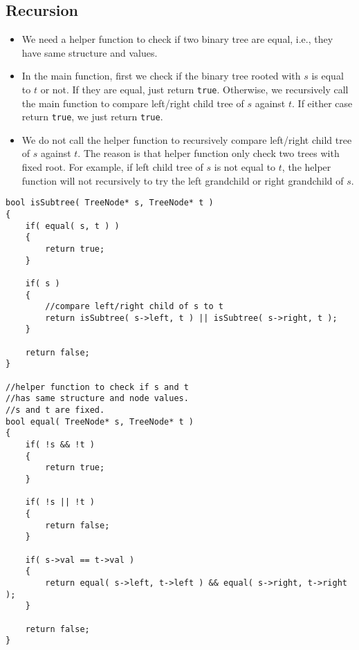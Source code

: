 \subsection{Recursion}
\begin{itemize}
\item We need a helper function to check if two binary tree are equal, i.e., they have same structure and values.
\item In the main function, first we check if the binary tree rooted with $s$ is equal to $t$ or not. If they are equal, just return \texttt{true}. Otherwise, we recursively call the main function to compare left/right child tree of $s$ against $t$. If either case return \texttt{true}, we just return \texttt{true}.
\item We do not call the helper function to recursively compare left/right child tree of $s$ against $t$. The reason is that helper function only check two trees with fixed root. For example, if left child tree of $s$ is not equal to $t$, the helper function will not recursively to try the left grandchild or right grandchild of $s$.
\end{itemize}

\setcounter{lstlisting}{0}
\begin{lstlisting}[style=customc, caption={Recursion}]
bool isSubtree( TreeNode* s, TreeNode* t )
{
    if( equal( s, t ) )
    {
        return true;
    }

    if( s )
    {
        //compare left/right child of s to t
        return isSubtree( s->left, t ) || isSubtree( s->right, t );
    }

    return false;
}

//helper function to check if s and t
//has same structure and node values.
//s and t are fixed.
bool equal( TreeNode* s, TreeNode* t )
{
    if( !s && !t )
    {
        return true;
    }

    if( !s || !t )
    {
        return false;
    }

    if( s->val == t->val )
    {
        return equal( s->left, t->left ) && equal( s->right, t->right );
    }

    return false;
}
\end{lstlisting}